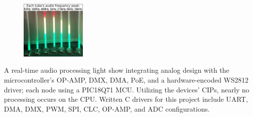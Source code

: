 \documentclass[
	10pt, %
]{FreemanCV}
\begin{document}
\begin{paracol}{2}
\setlength\intextsep{-5pt} %
\begin{figure} %
	\hspace*{-5pt} %
    \includegraphics[width=90pt]{dmx} %
\end{figure}

A real-time audio processing light show integrating analog design with the microcontroller's OP-AMP, DMX, DMA, PoE, and a hardware-encoded WS2812 driver; each node using a PIC18Q71 MCU. Utilizing the devices' CIPs, nearly no processing occurs on the CPU.
Written C drivers for this project include UART, DMA, DMX, PWM, SPI, CLC, OP-AMP, and ADC configurations.


\end{paracol}





	



\end{document}
